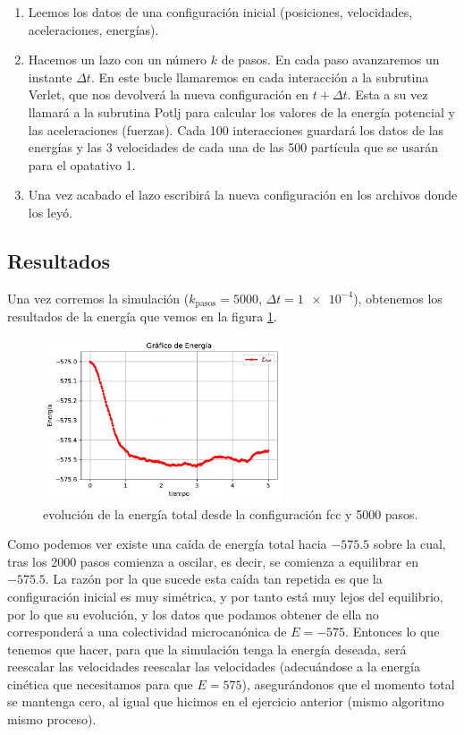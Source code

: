 \documentclass[11pt]{article} %
\begin{document}
\begin{enumerate}
	\item Leemos los datos de una configuración inicial (posiciones, velocidades, aceleraciones, energías).
	\item Hacemos un lazo con un número $k$ de pasos. En cada paso avanzaremos un instante $\Delta t$. En este bucle llamaremos en cada interacción a la subrutina Verlet, que nos devolverá la nueva configuración en $t+\Delta t$. Esta a su vez llamará a la subrutina Potlj para calcular los valores de la energía potencial y las aceleraciones (fuerzas). Cada 100 interacciones guardará los datos de las energías y las 3 velocidades de cada una de las 500 partícula que se usarán para el opatativo 1.
	\item Una vez acabado el lazo escribirá la nueva configuración en los archivos donde los leyó. 
\end{enumerate}

\newpage

\subsection{Resultados}

Una vez corremos la simulación ($k_{\text{pasos}}=5000$, $\Delta t=\num{1e-4}$), obtenemos los resultados de la energía que vemos en la figura \ref{Fig:01}. 

\begin{figure}[h!] \centering
	\includegraphics[width=0.63\textwidth]{../../Graficas/Et-equilibra.pdf}
	\caption{evolución de la energía total desde la configuración fcc y 5000 pasos.}
	\label{Fig:01}
\end{figure}	


Como podemos ver existe una caída de energía total hacia $-575.5$ sobre la cual, tras los 2000 pasos comienza a oscilar, es decir, se comienza a equilibrar en $-575.5$. La razón por la que sucede esta caída tan repetida es que la configuración inicial es muy simétrica, y por tanto está muy lejos del equilibrio, por lo que su evolución, y los datos que podamos obtener de ella no corresponderá a una colectividad microcanónica de $E=-575$. Entonces lo que tenemos que hacer, para que la simulación tenga la energía deseada, será reescalar las velocidades reescalar las velocidades (adecuándose a la energía cinética que necesitamos para que $E=575$), asegurándonos que el momento total se mantenga cero, al igual que hicimos en el ejercicio anterior (mismo algoritmo mismo proceso).
\end{document}
